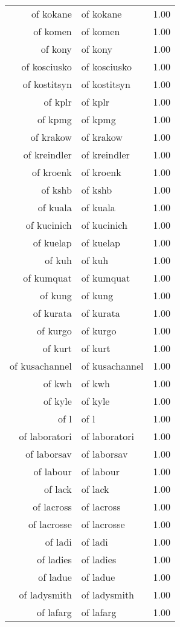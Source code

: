 \begin{table}[ht]
\begin{tabular}{rlr}
  of kokane & of kokane & 1.00 \\ 
  of komen & of komen & 1.00 \\ 
  of kony & of kony & 1.00 \\ 
  of kosciusko & of kosciusko & 1.00 \\ 
  of kostitsyn & of kostitsyn & 1.00 \\ 
  of kplr & of kplr & 1.00 \\ 
  of kpmg & of kpmg & 1.00 \\ 
  of krakow & of krakow & 1.00 \\ 
  of kreindler & of kreindler & 1.00 \\ 
  of kroenk & of kroenk & 1.00 \\ 
  of kshb & of kshb & 1.00 \\ 
  of kuala & of kuala & 1.00 \\ 
  of kucinich & of kucinich & 1.00 \\ 
  of kuelap & of kuelap & 1.00 \\ 
  of kuh & of kuh & 1.00 \\ 
  of kumquat & of kumquat & 1.00 \\ 
  of kung & of kung & 1.00 \\ 
  of kurata & of kurata & 1.00 \\ 
  of kurgo & of kurgo & 1.00 \\ 
  of kurt & of kurt & 1.00 \\ 
  of kusachannel & of kusachannel & 1.00 \\ 
  of kwh & of kwh & 1.00 \\ 
  of kyle & of kyle & 1.00 \\ 
  of l & of l & 1.00 \\ 
  of laboratori & of laboratori & 1.00 \\ 
  of laborsav & of laborsav & 1.00 \\ 
  of labour & of labour & 1.00 \\ 
  of lack & of lack & 1.00 \\ 
  of lacross & of lacross & 1.00 \\ 
  of lacrosse & of lacrosse & 1.00 \\ 
  of ladi & of ladi & 1.00 \\ 
  of ladies & of ladies & 1.00 \\ 
  of ladue & of ladue & 1.00 \\ 
  of ladysmith & of ladysmith & 1.00 \\ 
  of lafarg & of lafarg & 1.00 \\ 

\end{tabular}
\end{table}
